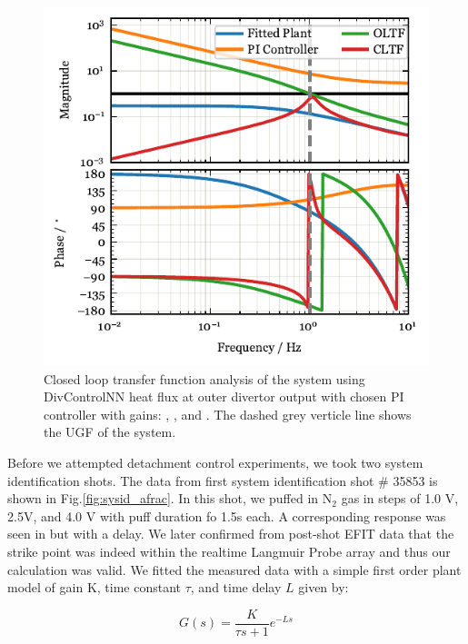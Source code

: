 \begin{figure}[!h]
 \centering
 \includegraphics[width=\linewidth]{figures/SM_LoopStability.pdf}
 \caption{Closed loop transfer function analysis of the system using DivControlNN heat flux at outer divertor output with chosen PI controller with gains: \SMKp, \SMTi, and \SMstau.
The dashed grey verticle line shows the \ac{UGF} of the system.}
\label{fig:cltf_sm}
\end{figure}

Before we attempted detachment control experiments, we took two system identification shots.
The data from first system identification shot \# 35853 is shown in Fig.\ref{fig:sysid_afrac}.
In this shot, we puffed in N$_2$ gas in steps of 1.0 V, 2.5V, and 4.0 V with puff duration fo 1.5s each.
A corresponding response was seen in \Afrac but with a delay.
We later confirmed from post-shot EFIT data that the strike point was indeed within the realtime Langmuir Probe array and thus our \Afrac calculation was valid.
We fitted the measured data with a simple first order plant model of gain K, time constant $\tau$, and time delay $L$ given by:

\begin{equation}
    G(s) = \frac{K}{\tau s + 1}e^{-L s}
\label{eq:sysid}
\end{equation}


